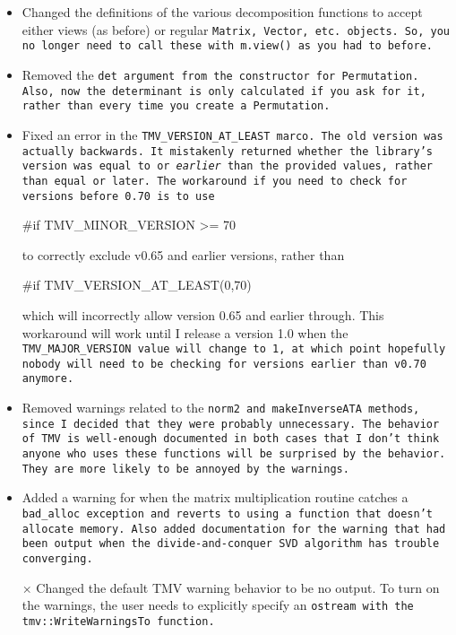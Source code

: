 \begin{itemize}
\item
Changed the definitions of the various decomposition functions
to accept either views (as before) or regular \tt{Matrix}, \tt{Vector},
etc. objects.  So, you no longer need to call these with \tt{m.view()}
as you had to before.

\item
Removed the \tt{det} argument from the constructor for \tt{Permutation}.
Also, now the determinant is only calculated if you ask for it, rather 
than every time you create a \tt{Permutation}.

\item
Fixed an error in the \tt{TMV\_VERSION\_AT\_LEAST} marco.  The old version was actually backwards.  It mistakenly returned whether the library's version was equal to or {\em earlier} than the provided values, rather than equal or later.  The workaround if you need to check for versions before 0.70 is to use 
\begin{tmvcode}
#if TMV_MINOR_VERSION >= 70 
\end{tmvcode}
to correctly exclude v0.65 and earlier versions, rather than
\begin{tmvcode}
#if TMV_VERSION_AT_LEAST(0,70)
\end{tmvcode}
which will incorrectly allow version 0.65 and earlier through.  This workaround will work until I release a version 1.0 when the \tt{TMV\_MAJOR\_VERSION} value will change to 1, at which point hopefully nobody will need to be checking for versions earlier than v0.70 anymore.

\item
Removed warnings related to the \tt{norm2} and \tt{makeInverseATA} methods, since I decided that they were probably unnecessary.  The behavior of TMV is well-enough documented in both cases that I don't think anyone who uses these functions will be surprised by the behavior.  They are more likely to be annoyed by the warnings.

\item 
Added a warning for when the matrix multiplication routine catches a \tt{bad\_alloc} exception and reverts to using a function that doesn't allocate memory.  Also added documentation for the warning that had been output when the divide-and-conquer SVD algorithm has trouble converging.

\item[$\times$]
Changed the default TMV warning behavior to be no output.  To turn on the warnings, the user needs to explicitly specify an \tt{ostream} with the \tt{tmv::WriteWarningsTo} function.


\end{itemize}
